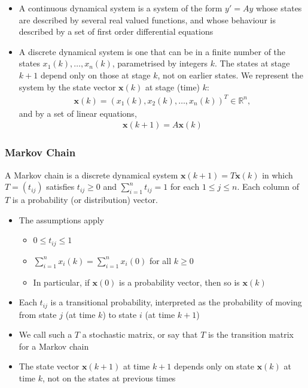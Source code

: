 \documentclass{report}
\renewcommand{\vec}{\mathbf}
\begin{document}
\begin{enumerate}
			\begin{itemize}
				\item A continuous dynamical system is a system of the form $y' = Ay$ whose states are described by several real valued functions, and whose behaviour is described by a set of first order differential equations
				\item A discrete dynamical system is one that can be in a finite number of the states $x_1(k), \dots, x_n(k)$, parametrised by integers $k$. The states at stage $k + 1$ depend only on those at stage $k$, not on earlier states. We represent the system by the state vector $\vec{x}(k)$ at stage (time) $k$:
					\begin{align*}
						\vec{x}(k) = \left(x_1(k), x_2(k), \dots, x_n(k) \right)^T \in \mathbb{R}^n,
					\end{align*}
					and by a set of linear equations,
					\begin{align*}
						\vec{x}(k+1) = A \vec{x} (k)
					\end{align*}
			\end{itemize}

			\subsubsection{Markov Chain}

			A Markov chain is a discrete dynamical system $\vec{x} (k + 1) = T \vec{x} (k)$ in which $T = (t_{ij})$ satisfies $t_{ij} \geq 0$ and $\sum_{i = 1}^{n} t_{ij} = 1$ for each $1 \leq j \leq n$. Each column of $T$ is a probability (or distribution) vector.

			\begin{itemize}
				\item The assumptions apply
					\begin{itemize}
						\item $0 \leq t_{ij} \leq 1$
						\item $\sum_{i = 1}^n x_i(k) = \sum_{i = 1}^n x_i(0)$ for all $k \geq 0$
						\item In particular, if $\vec{x}(0)$ is a probability vector, then so is $\vec{x}(k)$
					\end{itemize}
				\item Each $t_{ij}$ is a transitional probability, interpreted as the probability of moving from state $j$ (at time $k$) to state $i$ (at time $k + 1$)
				\item We call such a $T$ a stochastic matrix, or say that $T$ is the transition matrix for a Markov chain
				\item The state vector $\vec{x}(k + 1)$ at time $k + 1$ depends only on state $\vec{x}(k)$ at time $k$, not on the states at previous times
			\end{itemize}


\end{enumerate}
\end{document}
